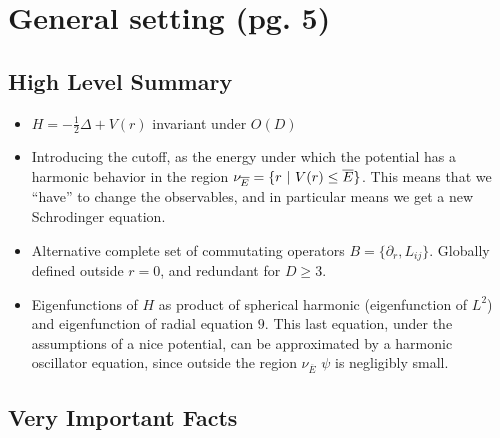 \documentclass{article}
\newcommand{\cut}[1]{\overline{#1}}
\begin{document}
\section{General setting (pg. 5)}

\subsection*{High Level Summary}

    \begin{itemize}

    \item $H = - \frac{1}{2} \Delta + V(r)$ invariant under $O(D)$
    
    \item Introducing the cutoff, as the energy under which the potential has a harmonic behavior in the region $\nu_{\cut E} = \{r \st V(r) \leq \cut E\}$. This means that we ``have'' to change the observables, and in particular means we get a new Schrodinger equation.
    
    \item Alternative complete set of commutating operators $B = \{\partial_r, L_{ij}\}$. Globally defined outside $r = 0$, and redundant for $D \geq 3$.
    
    \item Eigenfunctions of $H$ as product of spherical harmonic (eigenfunction of $L^2$) and eigenfunction of radial equation $9$. This last equation, under the assumptions of a nice potential, can be approximated by a harmonic oscillator equation, since outside the region $\nu_{\cut E}$ $\psi$ is negligibly small.
    
    \end{itemize}

\subsection*{Very Important Facts}
\end{document}
